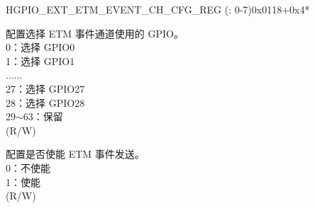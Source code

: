 \begin{register}{H}{GPIO\_EXT\_ETM\_EVENT\_CH\_CFG\_REG (: 0-7)}{0x0118+0x4*}\label{regdesc:GPIOEXTETMEVENTCHNCFGREG}
%
%
%
%
\regnewline%
\begin{regdesc}\begin{reglist}
\label{fielddesc:GPIOEXTETMCH0EVENTSEL}\item [GPIO\_EXT\_ETM\_CH\regindex{n}\_EVENT\_SEL] 配置选择 ETM 事件通道使用的 GPIO。\\
0：选择 GPIO0\\
1：选择 GPIO1\\
......\\
27：选择 GPIO27\\
28：选择 GPIO28\\ 
29$\sim$63：保留\\ (R/W)
\label{fielddesc:GPIOEXTETMCH0EVENTEN}\item [GPIO\_EXT\_ETM\_CH\regindex{n}\_EVENT\_EN] 配置是否使能 ETM 事件发送。\\
0：不使能 \\
1：使能\\ (R/W)
\end{reglist}\end{regdesc}
\end{register}


